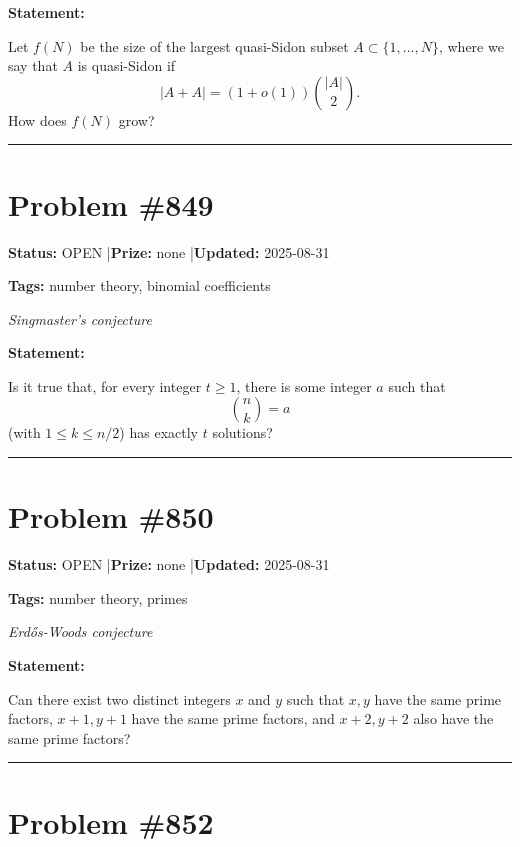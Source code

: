 \documentclass{article}
\begin{document}
\medskip

\noindent\textbf{Statement:}

Let $f(N)$ be the size of the largest quasi-Sidon subset $A\subset\{1,\ldots,N\}$, where we say that $A$ is quasi-Sidon if\[\lvert A+A\rvert=(1+o(1))\binom{\lvert A\rvert}{2}.\]How does $f(N)$ grow?

\noindent\rule{\linewidth}{0.4pt}


\section{Problem \#849}
\label{prob:849}

\noindent\textbf{Status:} OPEN \quad|\quad \textbf{Prize:} none \quad|\quad \textbf{Updated:} 2025-08-31

\noindent\textbf{Tags:} number theory, binomial coefficients

\medskip
\noindent\textit{Singmaster's conjecture}


\noindent\textbf{Statement:}

Is it true that, for every integer $t\geq 1$, there is some integer $a$ such that\[\binom{n}{k}=a\](with $1\leq k\leq n/2$) has exactly $t$ solutions?

\noindent\rule{\linewidth}{0.4pt}


\section{Problem \#850}
\label{prob:850}

\noindent\textbf{Status:} OPEN \quad|\quad \textbf{Prize:} none \quad|\quad \textbf{Updated:} 2025-08-31

\noindent\textbf{Tags:} number theory, primes

\medskip
\noindent\textit{Erdős-Woods conjecture}


\noindent\textbf{Statement:}

Can there exist two distinct integers $x$ and $y$ such that $x,y$ have the same prime factors, $x+1,y+1$ have the same prime factors, and $x+2,y+2$ also have the same prime factors?

\noindent\rule{\linewidth}{0.4pt}


\section{Problem \#852}
\label{prob:852}
\end{document}
